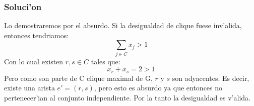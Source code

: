 \subsubsection{Soluci'on}
Lo demostraremos por el absurdo. Si la desigualdad de clique fuese inv'alida, entonces tendriamos:
\begin{equation}
\sum_{j\in C} x_{j} > 1
\end{equation}
 Con lo cual existen $r, s \in C$  tales que:
\begin{equation}
x_{r} + x_{s} = 2 > 1
\end{equation}
Pero como son parte de C clique maximal de G, $r$ y $s$ son adyacentes. Es decir, existe una arista $e' = (r,s)$, pero esto es absurdo ya que entonces no pertenecer'ian al conjunto independiente.
Por la tanto la desigualdad es v'alida.